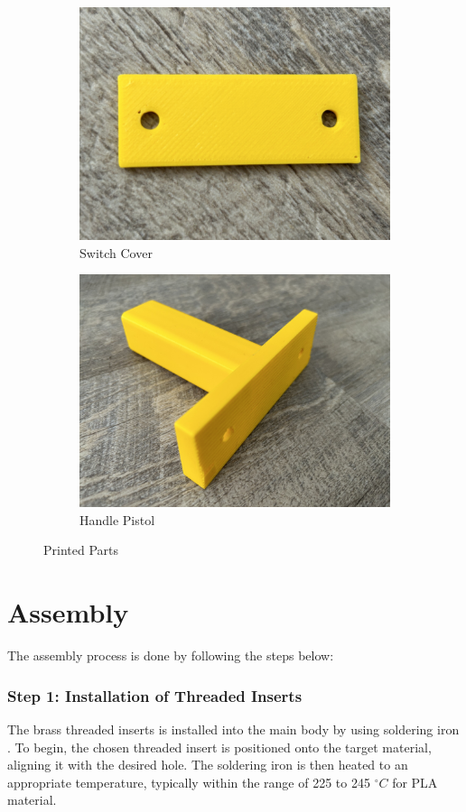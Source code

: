 \begin{figure}[h!]
\begin{subfigure}[c]{0.45\textwidth}
        \label{fig:printed_battery_cover}
    \end{subfigure}
    \begin{subfigure}[c]{0.45\textwidth}
        \begin{minipage}{\textwidth}
            \centering
            \includegraphics[height=4 cm]{texs/Part1/chapter5/image/res_switch.jpg}
        \end{minipage}
        \caption{Switch Cover}
        \label{fig:printed_switch_cover}
    \end{subfigure}
    \begin{subfigure}[c]{0.45\textwidth}
        \begin{minipage}{\textwidth}
            \centering
            \includegraphics[height=4 cm]{texs/Part1/chapter5/image/res_grip.jpg}
        \end{minipage}
        \caption{Handle Pistol}
        \label{fig:printed_handle_pistol}
    \end{subfigure}
    \caption{Printed Parts}
    \label{fig:printedparts}
\end{figure}

\section{Assembly}
\label{sec:assembly}

The assembly process is done by following the steps below:

\subsubsection{Step 1: Installation of Threaded Inserts}
The brass threaded inserts is installed into the main body by using soldering iron \cite{Hermann23}. To begin, the chosen threaded insert is positioned onto the target material, aligning it with the desired hole. The soldering iron is then heated to an appropriate temperature, typically within the range of 225 to 245 $^{\circ}C$ for PLA material.


